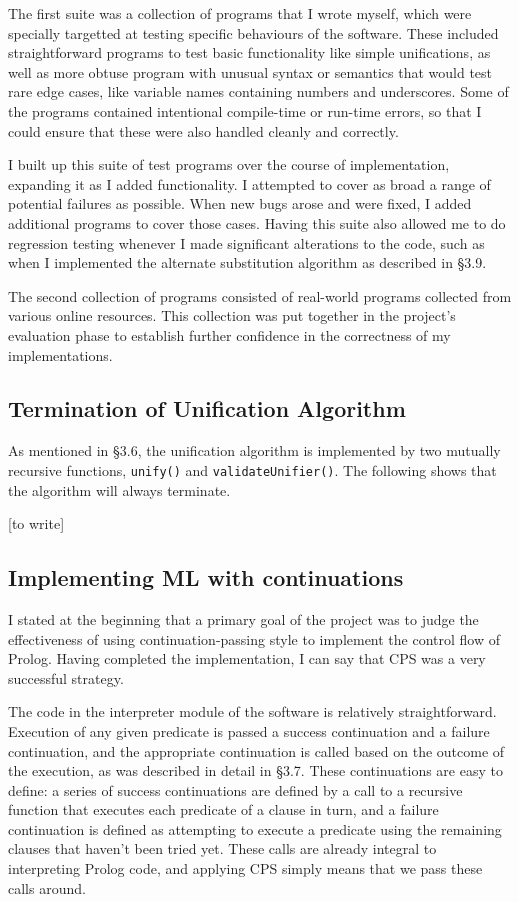 \documentclass[12pt]{article}
\begin{document}
The first suite was a collection of programs that I wrote myself, which were specially targetted at testing specific behaviours of the software.
These included straightforward programs to test basic functionality like simple unifications, as well as more obtuse program with unusual syntax or semantics that would test rare edge cases, like variable names containing numbers and underscores.
Some of the programs contained intentional compile-time or run-time errors, so that I could ensure that these were also handled cleanly and correctly.

I built up this suite of test programs over the course of implementation, expanding it as I added functionality. 
I attempted to cover as broad a range of potential failures as possible. 
When new bugs arose and were fixed, I added additional programs to cover those cases.
Having this suite also allowed me to do regression testing whenever I made significant alterations to the code, such as when I implemented the alternate substitution algorithm as described in \S3.9.

The second collection of programs consisted of real-world programs collected from various online resources.
This collection was put together in the project's evaluation phase to establish further confidence in the correctness of my implementations.

\subsection{Termination of Unification Algorithm}

As mentioned in \S3.6, the unification algorithm is implemented by two mutually recursive functions, \verb|unify()| and \verb|validateUnifier()|. The following shows that the algorithm will always terminate.

[to write]

\subsection{Implementing ML with continuations}

I stated at the beginning that a primary goal of the project was to judge the effectiveness of using continuation-passing style to implement the control flow of Prolog. 
Having completed the implementation, I can say that CPS was a very successful strategy.

The code in the interpreter module of the software is relatively straightforward. 
Execution of any given predicate is passed a success continuation and a failure continuation, and the appropriate continuation is called based on the outcome of the execution, as was described in detail in \S3.7. 
These continuations are easy to define: a series of success continuations are defined by a call to a recursive function that executes each predicate of a clause in turn, and a failure continuation is defined as attempting to execute a predicate using the remaining clauses that haven't been tried yet. 
These calls are already integral to interpreting Prolog code, and applying CPS simply means that we pass these calls around.
\end{document}
